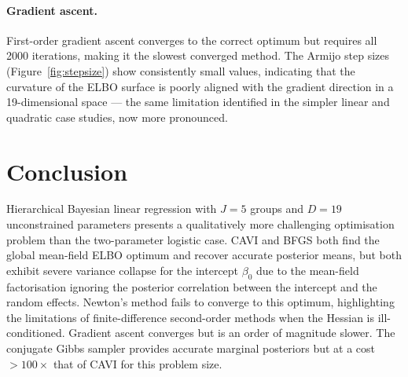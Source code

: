 \documentclass[11pt,a4paper]{article}
\begin{document}
\paragraph{Gradient ascent.}
First-order gradient ascent converges to the correct optimum but requires all 2000
iterations, making it the slowest converged method.
The Armijo step sizes (Figure~\ref{fig:stepsize}) show consistently small values,
indicating that the curvature of the ELBO surface is poorly aligned with the gradient
direction in a 19-dimensional space --- the same limitation identified in the simpler
linear and quadratic case studies, now more pronounced.

\section{Conclusion}

Hierarchical Bayesian linear regression with $J=5$ groups and $D=19$ unconstrained
parameters presents a qualitatively more challenging optimisation problem than the
two-parameter logistic case.
CAVI and BFGS both find the global mean-field ELBO optimum and recover accurate
posterior means, but both exhibit severe variance collapse for the intercept $\beta_0$
due to the mean-field factorisation ignoring the posterior correlation between the
intercept and the random effects.
Newton's method fails to converge to this optimum, highlighting the limitations of
finite-difference second-order methods when the Hessian is ill-conditioned.
Gradient ascent converges but is an order of magnitude slower.
The conjugate Gibbs sampler provides accurate marginal posteriors but at a cost
$>100\times$ that of CAVI for this problem size.

\printbibliography
\end{document}
